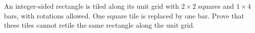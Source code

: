 An integer-sided rectangle is tiled along its unit grid with $2\times2$ squares and $1\times4$ bars, with rotations allowed. One square tile is replaced by one bar. Prove that these tiles cannot retile the same rectangle along the unit grid.
